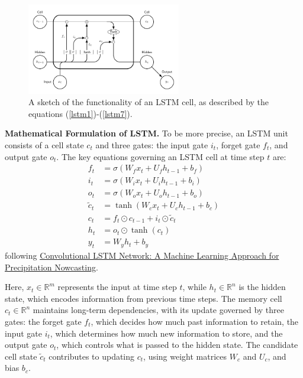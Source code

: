 \begin{figure}[ht]
    \centering
    \includegraphics[width=0.6\textwidth]{chapters/lstm_graph.pdf}
    \caption{A sketch of the functionality of an LSTM cell, as described by the equations (\ref{lstm1})-(\ref{lstm7}). }
    \label{fig:lstm_graph}
\end{figure}

{\bf Mathematical Formulation of LSTM.} To be more precise, an LSTM unit consists of a cell state \( c_t \) and three gates: the input gate \( i_t \), forget gate \( f_t \), and output gate \( o_t \). The key equations governing an LSTM cell at time step \( t \) are:
\begin{eqnarray}
    f_t &= \sigma(W_f x_t + U_f h_{t-1} + b_f) \label{lstm1} \\
    i_t &= \sigma(W_i x_t + U_i h_{t-1} + b_i) \\
    o_t &= \sigma(W_o x_t + U_o h_{t-1} + b_o) \\
    \tilde{c}_t &= \tanh(W_c x_t + U_c h_{t-1} + b_c) \\
    c_t &= f_t \odot c_{t-1} + i_t \odot \tilde{c}_t \\
    h_t &= o_t \odot \tanh(c_t) \\
    y_t &= W_y h_t + b_y \label{lstm7}
\end{eqnarray}
following \href{https://arxiv.org/pdf/1506.04214}{Convolutional LSTM Network: A Machine Learning Approach for Precipitation Nowcasting}. 

Here, \( x_t \in \mathbb{R}^{m} \) represents the input at time step \( t \), while \( h_t \in \mathbb{R}^{n} \) is the hidden state, which encodes information from previous time steps. The memory cell \( c_t \in \mathbb{R}^{n} \) maintains long-term dependencies, with its update governed by three gates: the forget gate \( f_t \), which decides how much past information to retain, the input gate \( i_t \), which determines how much new information to store, and the output gate \( o_t \), which controls what is passed to the hidden state. The candidate cell state \( \tilde{c}_t \) contributes to updating \( c_t \), using weight matrices \( W_c \) and \( U_c \), and bias \( b_c \).

